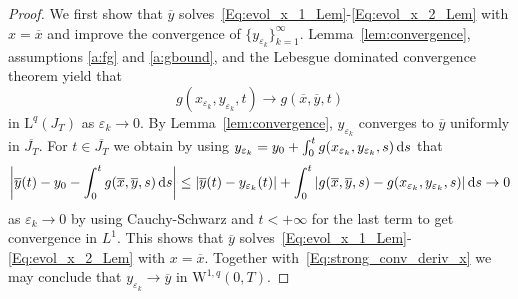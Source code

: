 \documentclass[12pt]{article}
\def\I{\infty}
\def\txtd{{\textnormal{d}}}
\newcommand{\be}{\begin{equation}}
\newcommand{\ee}{\end{equation}}
\def\ra{\rightarrow}
\def\I{\infty}
\begin{document}
\begin{proof}
We first show that $\overline{y}$ solves~\eqref{Eq:evol_x_1_Lem}-\eqref{Eq:evol_x_2_Lem} 
with $x=\overline{x}$ and improve the convergence of $\{y_{\varepsilon_k}\}_{k=1}^\I$.
Lemma~\ref{lem:convergence}, assumptions \ref{a:fg} and \ref{a:gbound}, and the Lebesgue 
dominated convergence theorem yield that
\be
\label{Eq:strong_conv_deriv_x}
g(x_{\varepsilon_k},y_{\varepsilon_k},t) \ra g(\overline{x},\overline{y},t)
\ee
in $\mathrm{L}^q(J_T)$ as $\varepsilon_k \rightarrow 0$. By Lemma~\ref{lem:convergence}, 
$y_{\varepsilon_k}$ converges to $\overline{y}$ uniformly in $\overline{J_T}$. For 
$t\in \overline{J_T}$ we obtain by using $y_{\varepsilon_k} = y_0 + \int_{0}^{t} 
g(x_{\varepsilon_k},y_{\varepsilon_k},s) \, \txtd s$ that
\be
\left|\overline{y}(t) - y_0 - \int_{0}^{t} g(\overline{x},\overline{y},s) \, \txtd s\right|
\leq | \overline{y}(t) - y_{\varepsilon_k}(t) |
+ \int_{0}^{t} | g(\overline{x},\overline{y},s) 
- g(x_{\varepsilon_k},y_{\varepsilon_k},s)| \, \txtd s
\rightarrow 0 
\ee
as $\varepsilon_k \rightarrow 0$ by using Cauchy-Schwarz and $t<+\I$ for the last term
to get convergence in $L^1$. This shows that $\overline{y}$ 
solves~\eqref{Eq:evol_x_1_Lem}-\eqref{Eq:evol_x_2_Lem} with $x=\overline{x}$. Together 
with~\eqref{Eq:strong_conv_deriv_x} we may conclude 
that $y_{\varepsilon_k}\rightarrow \overline{y}$ in $\mathrm{W}^{1,q}(0,T)$.


\end{proof}
\end{document}
